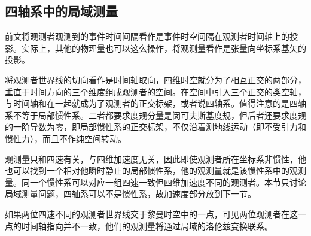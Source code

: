 \documentclass[UTF8, 12pt, a4paper, oneside, onecolumn, fontset=none]{ctexart}
\begin{document}
\subsection{四轴系中的局域测量}
前文将观测者观测到的事件时间间隔看作是事件时空间隔在观测者时间轴上的投影。实际上，其他的物理量也可以这么操作，将观测量看作是张量向坐标系基矢的投影。

将观测者世界线的切向看作是时间轴取向，四维时空就分为了相互正交的两部分，垂直于时间方向的三个维度组成观测者的空间。在空间中引入三个正交的类空轴，与时间轴和在一起就成为了观测者的正交标架，或者说四轴系。值得注意的是四轴系不等于局部惯性系。二者都要求度规分量是闵可夫斯基度规，但后者还要求度规的一阶导数为零，即局部惯性系的正交标架，不仅沿着测地线运动（即不受引力和惯性力），而且不作纯空间转动。

观测量只和四速有关，与四维加速度无关，因此即使观测者所在坐标系非惯性，他也可以找到一个相对他瞬时静止的局部惯性系，他的观测量就是该惯性系中的观测量。同一个惯性系可以对应一组四速一致但四维加速度不同的观测者。本节只讨论局域测量问题，四轴系可以不是惯性系，故加速度部分放到下一节。

如果两位四速不同的观测者世界线交于黎曼时空中的一点，可见两位观测者在这一点的时间轴指向并不一致，他们的观测量将通过局域的洛伦兹变换联系。
\end{document}

